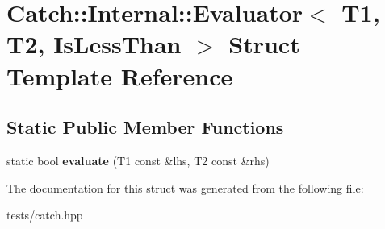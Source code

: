 \hypertarget{struct_catch_1_1_internal_1_1_evaluator_3_01_t1_00_01_t2_00_01_is_less_than_01_4}{}\section{Catch\+:\+:Internal\+:\+:Evaluator$<$ T1, T2, Is\+Less\+Than $>$ Struct Template Reference}
\label{struct_catch_1_1_internal_1_1_evaluator_3_01_t1_00_01_t2_00_01_is_less_than_01_4}
\subsection*{Static Public Member Functions}
\begin{DoxyCompactItemize}
\item 
\mbox{\label{struct_catch_1_1_internal_1_1_evaluator_3_01_t1_00_01_t2_00_01_is_less_than_01_4_a75b2bcf80ce6f90218c145e2c3293d75}} 
static bool {\bfseries evaluate} (T1 const \&lhs, T2 const \&rhs)
\end{DoxyCompactItemize}


The documentation for this struct was generated from the following file\+:\begin{DoxyCompactItemize}
\item 
tests/catch.\+hpp\end{DoxyCompactItemize}
